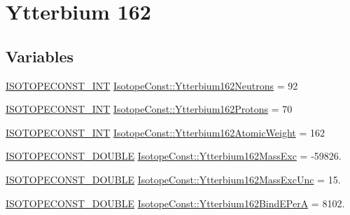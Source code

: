 \hypertarget{group___isotope_const-_ytterbium-_yb162}{}\section{Ytterbium 162}
\label{group___isotope_const-_ytterbium-_yb162}
\subsection*{Variables}
\begin{DoxyCompactItemize}
\item 
\mbox{\hyperlink{group___isotope_const-_macros_ga5f18360b3e99483a35c32d789e62621c}{I\+S\+O\+T\+O\+P\+E\+C\+O\+N\+S\+T\+\_\+\+I\+NT}} \mbox{\hyperlink{group___isotope_const-_ytterbium-_yb162_gab12945a82c7b4e757920c99345fc5f38}{Isotope\+Const\+::\+Ytterbium162\+Neutrons}} = 92
\item 
\mbox{\hyperlink{group___isotope_const-_macros_ga5f18360b3e99483a35c32d789e62621c}{I\+S\+O\+T\+O\+P\+E\+C\+O\+N\+S\+T\+\_\+\+I\+NT}} \mbox{\hyperlink{group___isotope_const-_ytterbium-_yb162_gae9fe6c182e53004c0f2009cdf47e2786}{Isotope\+Const\+::\+Ytterbium162\+Protons}} = 70
\item 
\mbox{\hyperlink{group___isotope_const-_macros_ga5f18360b3e99483a35c32d789e62621c}{I\+S\+O\+T\+O\+P\+E\+C\+O\+N\+S\+T\+\_\+\+I\+NT}} \mbox{\hyperlink{group___isotope_const-_ytterbium-_yb162_ga127e4062e06c5508a230756d49dd4b26}{Isotope\+Const\+::\+Ytterbium162\+Atomic\+Weight}} = 162
\item 
\mbox{\hyperlink{group___isotope_const-_macros_ga8f45a7272ce02c0b4c65c44636ed719a}{I\+S\+O\+T\+O\+P\+E\+C\+O\+N\+S\+T\+\_\+\+D\+O\+U\+B\+LE}} \mbox{\hyperlink{group___isotope_const-_ytterbium-_yb162_ga02143766b30b335754537d8f33257d70}{Isotope\+Const\+::\+Ytterbium162\+Mass\+Exc}} = -\/59826.
\item 
\mbox{\hyperlink{group___isotope_const-_macros_ga8f45a7272ce02c0b4c65c44636ed719a}{I\+S\+O\+T\+O\+P\+E\+C\+O\+N\+S\+T\+\_\+\+D\+O\+U\+B\+LE}} \mbox{\hyperlink{group___isotope_const-_ytterbium-_yb162_gae66bb50e49e826427515769223197fb8}{Isotope\+Const\+::\+Ytterbium162\+Mass\+Exc\+Unc}} = 15.
\item 
\mbox{\hyperlink{group___isotope_const-_macros_ga8f45a7272ce02c0b4c65c44636ed719a}{I\+S\+O\+T\+O\+P\+E\+C\+O\+N\+S\+T\+\_\+\+D\+O\+U\+B\+LE}} \mbox{\hyperlink{group___isotope_const-_ytterbium-_yb162_ga953de08f455f23897423d99c394d9a48}{Isotope\+Const\+::\+Ytterbium162\+Bind\+E\+PerA}} = 8102.
\item 

\end{DoxyCompactItemize}
